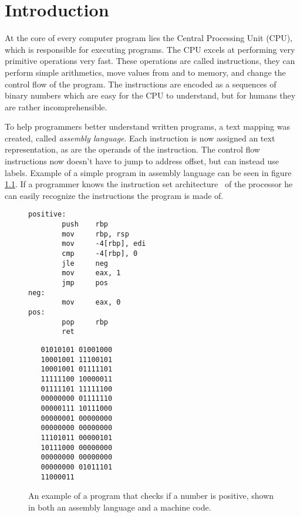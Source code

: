 \chapter{Introduction}
At the core of every computer program lies the Central Processing Unit (CPU),
which is responsible for executing programs. The CPU excels at performing very
primitive operations very fast. These operations are called instructions, they
can perform simple arithmetics, move values from and to memory, and change the
control flow of the program. The instructions are encoded as a sequences of
binary numbers which are easy for the CPU to understand, but for humans they
are rather incomprehensible.

To help programmers better understand written programs, a text mapping was
created, called \textit{assembly language}. Each instruction is now assigned an
text representation, as are the operands of the instruction. The control flow
instructions now doesn't have to jump to address offset, but can instead use
labels. Example of a simple program in assembly language can be seen in figure
\ref{fig:simple-assembly}. If a programmer knows the instruction set
architecture~\cite{aps-isa} of the processor he can easily recognize the
instructions the program is made of.

\begin{figure}
    \begin{minipage}{.45\textwidth}
    \begin{lstlisting}
positive:
        push    rbp
        mov     rbp, rsp
        mov     -4[rbp], edi
        cmp     -4[rbp], 0
        jle     neg
        mov     eax, 1
        jmp     pos
neg:
        mov     eax, 0
pos:
        pop     rbp
        ret
    \end{lstlisting}
    \end{minipage}
    \hfill\vline\hfill
    \begin{minipage}{.45\textwidth}
    \begin{lstlisting}
   01010101 01001000
   10001001 11100101
   10001001 01111101
   11111100 10000011
   01111101 11111100
   00000000 01111110
   00000111 10111000
   00000001 00000000
   00000000 00000000
   11101011 00000101
   10111000 00000000
   00000000 00000000
   00000000 01011101
   11000011
    \end{lstlisting}
    \end{minipage}
    \caption{An example of a program that checks if a number is positive, shown
    in both an assembly language and a machine code.}
    \label{fig:simple-assembly}
\end{figure}

